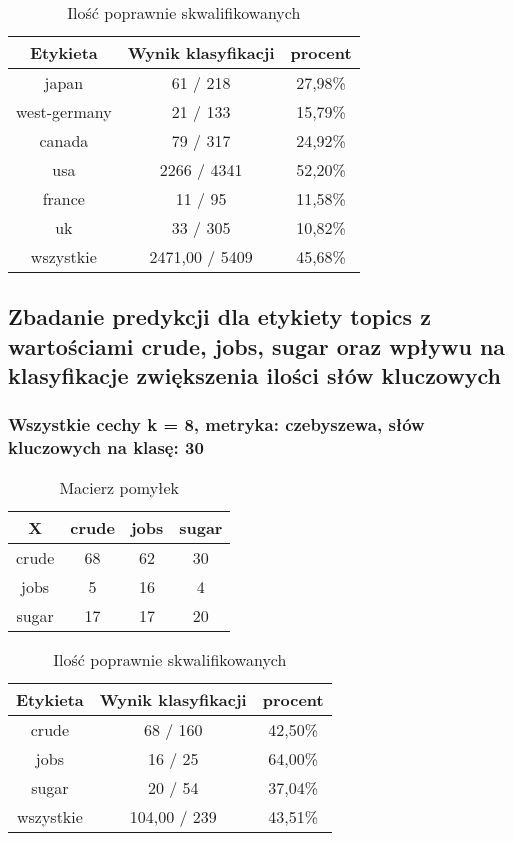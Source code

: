 \documentclass{classrep}
\begin{document}
\begin{table}[h]
\centering
\begin{tabular}{|c|c|c|}
\hline
Etykieta & Wynik klasyfikacji & procent\\
\hline
japan & 61 / 218 & 27,98\%\\
\hline
west-germany & 21 / 133 & 15,79\%\\
\hline
canada & 79 / 317 & 24,92\%\\
\hline
usa & 2266 / 4341 & 52,20\%\\
\hline
france & 11 / 95 & 11,58\%\\
\hline
uk & 33 / 305 & 10,82\%\\
\hline
wszystkie & 2471,00 / 5409 & 45,68\%\\
\hline
\end{tabular}
\caption{Ilość poprawnie skwalifikowanych}\end{table}

\newpage
\subsection{Zbadanie predykcji dla etykiety topics z wartościami crude, jobs, sugar oraz wpływu na klasyfikacje zwiększenia ilości słów kluczowych}

\subsubsection{Wszystkie cechy k = 8, metryka: czebyszewa, słów kluczowych na klasę: 30}
\begin{table}[h]
\centering
\begin{tabular}{|c|c|c|c|}
\hline
 X  & crude & jobs & sugar\\
\hline
crude & 68 & 62 & 30\\
\hline
jobs & 5 & 16 & 4\\
\hline
sugar & 17 & 17 & 20\\
\hline
\end{tabular}
\caption{Macierz pomyłek}\end{table}

\begin{table}[h]
\centering
\begin{tabular}{|c|c|c|}
\hline
Etykieta & Wynik klasyfikacji & procent\\
\hline
crude & 68 / 160 & 42,50\%\\
\hline
jobs & 16 / 25 & 64,00\%\\
\hline
sugar & 20 / 54 & 37,04\%\\
\hline
wszystkie & 104,00 / 239 & 43,51\%\\
\hline
\end{tabular}
\caption{Ilość poprawnie skwalifikowanych}\end{table}
\end{document}
